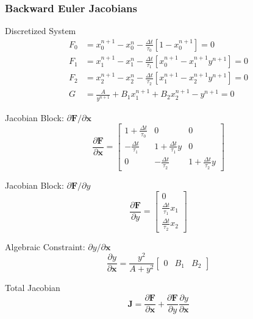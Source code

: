 \frametitle{Backward Euler Jacobians}

\begin{block}{Discretized System}
\begin{align*}
F_0 &= x_0^{n+1} - x_0^n - \frac{\Delta t}{\tau_0}[1 - x_0^{n+1}] = 0 \\[0.2cm]
F_1 &= x_1^{n+1} - x_1^n - \frac{\Delta t}{\tau_1}[x_0^{n+1} - x_1^{n+1} y^{n+1}] = 0 \\[0.2cm]
F_2 &= x_2^{n+1} - x_2^n - \frac{\Delta t}{\tau_2}[x_1^{n+1} - x_2^{n+1} y^{n+1}] = 0 \\[0.2cm]
G &= \frac{A}{y^{n+1}} + B_1 x_1^{n+1} + B_2 x_2^{n+1} - y^{n+1} = 0
\end{align*}
\end{block}

\begin{block}{Jacobian Block: $\partial \mathbf{F} / \partial \mathbf{x}$}
\begin{equation*}
\frac{\partial \mathbf{F}}{\partial \mathbf{x}} = \begin{bmatrix}
1 + \frac{\Delta t}{\tau_0} & 0 & 0 \\[0.3cm]
-\frac{\Delta t}{\tau_1} & 1 + \frac{\Delta t}{\tau_1} y & 0 \\[0.3cm]
0 & -\frac{\Delta t}{\tau_2} & 1 + \frac{\Delta t}{\tau_2} y
\end{bmatrix}
\end{equation*}
\end{block}

\begin{block}{Jacobian Block: $\partial \mathbf{F} / \partial y$}
\begin{equation*}
\frac{\partial \mathbf{F}}{\partial y} = \begin{bmatrix}
0 \\[0.3cm]
\frac{\Delta t}{\tau_1} x_1 \\[0.3cm]
\frac{\Delta t}{\tau_2} x_2
\end{bmatrix}
\end{equation*}
\end{block}

\begin{block}{Algebraic Constraint: $\partial y / \partial \mathbf{x}$}
\begin{equation*}
\frac{\partial y}{\partial \mathbf{x}} = \frac{y^2}{A + y^2} \begin{bmatrix} 0 & B_1 & B_2 \end{bmatrix}
\end{equation*}
\end{block}

\begin{block}{Total Jacobian}
\begin{equation*}
\mathbf{J} = \frac{\partial \mathbf{F}}{\partial \mathbf{x}} + \frac{\partial \mathbf{F}}{\partial y} \frac{\partial y}{\partial \mathbf{x}}
\end{equation*}
\end{block}